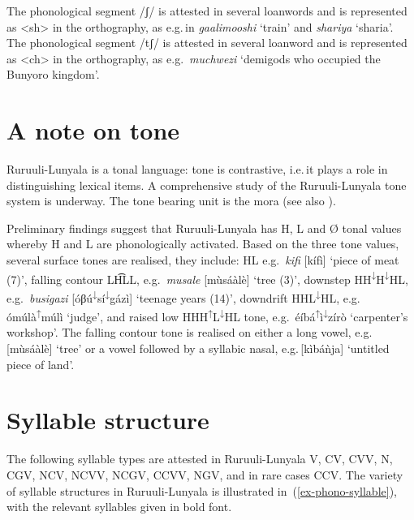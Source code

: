 The phonological segment /ʃ/ is attested in several loanwords and is represented as <sh> in the orthography, as e.g.\,in  \textit{gaalimooshi} `train' and  \textit{shariya} `sharia'. 
The phonological segment /tʃ/ is attested in several loanword and is represented as <ch> in the orthography, as e.g.\, \textit{muchwezi} `demigods who occupied the Bunyoro kingdom'.

\section{A note on tone}\label{sec-phonology-tone}

Ruruuli-Lunyala is a tonal language: tone is contrastive, i.e.\,it plays a role in distinguishing lexical items. 
A comprehensive study of the Ru\-ruu\-li\hyp{}Lu\-nya\-la tone system is underway. 
The tone bearing unit is the mora (see also \citealt{deBrito2019Tonology}).

Preliminary findings suggest that Ru\-ruu\-li-Lu\-nya\-la has H, L and Ø tonal values whereby H and L are phonologically activated. 
Based on the three tone values, several surface tones are realised, they include: HL e.g.\, \textit{kifi} [kífì] ‘piece of meat (7)’, falling contour LH͡LL, e.g.\, \textit{musale} [mùsáàlè] ‘tree (3)’, downstep HH{\small \textsuperscript{↓}}H{\small \textsuperscript{↓}}HL, e.g.\, \textit{busigazi} [óβú{\small \textsuperscript{↓}}sí{\small \textsuperscript{↓}}gázì] ‘teenage years (14)’, downdrift HHL{\small \textsuperscript{↓}}HL, e.g.\, ómúlà{\small \textsuperscript{↑}}múlì ‘judge’, and raised low HHH{\small \textsuperscript{↑}}L{\small \textsuperscript{↓}}HL tone, e.g.\, éíbá{\small \textsuperscript{↑}}ì{\small \textsuperscript{↓}}zírò ‘carpenter’s workshop’. 
The falling contour tone is realised on either a long vowel, e.g.\,[mùsáàlè] ‘tree’ or a vowel followed by a syllabic nasal, e.g.\,[kìbáǹja] ‘untitled piece of land’.


\section{Syllable structure}\label{sec-phonology-syllable}

The following syllable types are attested in Ru\-ruu\-li\hyp{}Lu\-nya\-la V, CV, CVV, N, CGV, 
NCV, NCVV, NCGV, CCVV, NGV, and in rare cases CCV. 
The variety of syllable structures in Ru\-ruu\-li\hyp{}Lu\-nya\-la is illustrated in~(\ref{ex-phono-syllable}), with the relevant syllables given in bold font. 

